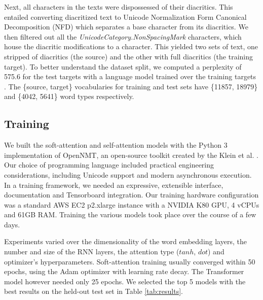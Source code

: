 \documentclass[a4paper]{article}
\begin{document}
Next, all characters in the texts were dispossessed of their diacritics. This entailed converting diacritized text to Unicode Normalization Form Canonical Decomposition (NFD) which separates a base character from its diacritics. We then filtered out all the \emph{UnicodeCategory.NonSpacingMark} characters, which house the diacritic modifications to a character. This yielded two sets of text, one stripped of diacritics (the source) and the other with full diacritics (the training target). To better understand the dataset split, we computed a perplexity of 575.6 for the test targets with a language model trained over the training targets \cite{stolcke2002srilm}. The \{source, target\} vocabularies for training and test sets have \{11857, 18979\} and \{4042, 5641\} word types respectively.

\subsection{Training}
We built the soft-attention and self-attention models with the Python 3 implementation of OpenNMT, an open-source toolkit created by the Klein et al. \cite{opennmt}. Our choice of programming language included practical engineering considerations, including Unicode support and modern asynchronous execution. In a training framework, we needed an expressive, extensible interface, documentation and Tensorboard integration. Our training hardware configuration was a standard AWS EC2 p2.xlarge instance with a NVIDIA K80 GPU, 4 vCPUs and 61GB RAM. Training the various models took place over the course of a few days.

Experiments varied over the dimensionality of the word embedding layers, the number and size of the RNN layers, the attention type ($tanh$, $dot$) and optimizer's hyperparameters. Soft-attention training usually converged within 50 epochs, using the Adam optimizer with learning rate decay. The Transformer model however needed only 25 epochs. We selected the top 5 models with the best results on the held-out test set in Table \ref{tab:results}. 
\end{document}
